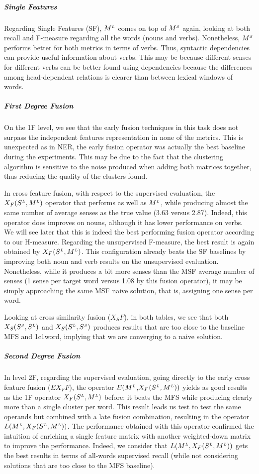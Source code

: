 \subparagraph{Single Features}
Regarding Single Features (SF), $M^{\scriptscriptstyle L}$ comes on top of $M^{\scriptscriptstyle S}$ again, looking at both recall and F-measure regarding all the words (nouns and verbs). Nonetheless, $M^{\scriptscriptstyle S}$ performs better for both metrics in terms of verbs. Thus, syntactic dependencies can provide useful information  about verbs. This may be because different senses for different verbs can be better found using dependencies because the differences among head-dependent relations is clearer than between lexical windows of words. 

\subparagraph{First Degree Fusion}
On the 1F level, we see that the early fusion techniques in this task does not surpass the independent features representation in none of the metrics. This is unexpected as in NER, the early fusion operator was actually the best baseline during the experiments. This may be due to the fact that the clustering algorithm is sensitive to the noise produced when adding both matrices together, thus reducing the quality of the clusters found. 

In cross feature fusion, with respect to the supervised evaluation, the $X_F(S^{\scriptscriptstyle L},M^{\scriptscriptstyle L})$ operator that performs as well as $M^{\scriptscriptstyle L}$, while producing almost the same number of average senses as the true value (3.63 versus 2.87). Indeed, this operator does improves on nouns, although it has lower performance on verbs. We will see later that this is indeed the best performing fusion operator according to our H-measure.
%
Regarding the unsupervised F-measure, the best result is again obtained by $X_F(S^{\scriptscriptstyle L}, M^{\scriptscriptstyle L})$. This configuration already beats the SF baselines by improving both noun and verb results on the unsupervised evaluation. Nonetheless,  while it produces a bit more senses than the MSF average number of senses (1 sense per target word versus 1.08 by this fusion operator), it may be simply approaching  the same MSF naive solution, that is, assigning one sense per word. 


Looking at cross similarity fusion ($X_SF$), in both tables, we see that both  $X_S(S^{\scriptscriptstyle S},S^{\scriptscriptstyle L})$ and $X_S(S^{\scriptscriptstyle L},S^{\scriptscriptstyle S})$ produces results that are too close to the baseline MFS and 1c1word, implying that we are converging to a naive solution.


\subparagraph{Second Degree Fusion}
In level 2F, regarding the supervised evaluation, going directly to  the early cross feature fusion ($EX_FF$), the operator $E(M^{\scriptscriptstyle L}$,$X_F(S^{\scriptscriptstyle L}, M^{\scriptscriptstyle L}))$ yields as good results as the 1F operator  $X_F(S^{\scriptscriptstyle L}, M^{\scriptscriptstyle L})$ before: it beats the MFS while producing clearly more than a single cluster per word. This result leads us  test to test the same operands but combined with a late fusion combination, resulting in the operator $L(M^{\scriptscriptstyle L}, X_F(S^{\scriptscriptstyle L},M^{\scriptscriptstyle L}))$. The performance obtained with this operator confirmed the intuition of enriching a single feature matrix with another weighted-down matrix to improve the performance. Indeed, we consider that $L(M^{\scriptscriptstyle L}, X_F(S^{\scriptscriptstyle L}, M^{\scriptscriptstyle L}))$ gets the best results in terms of all-words supervised recall (while not considering solutions that are too close to the MFS baseline). 


